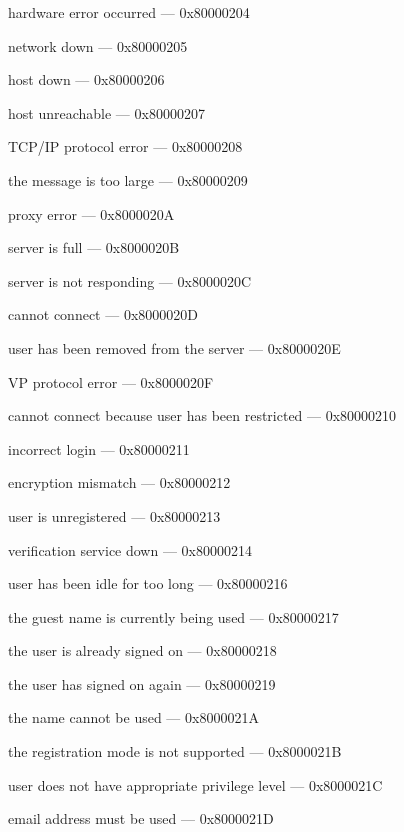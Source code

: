 \documentclass[titlepage,oneside]{book}
\begin{document}
hardware error occurred                           --- 0x80000204

network down                                      --- 0x80000205

host down                                         --- 0x80000206

host unreachable                                  --- 0x80000207

TCP/IP protocol error                             --- 0x80000208

the message is too large                          --- 0x80000209

proxy error                                       --- 0x8000020A

server is full                                    --- 0x8000020B

server is not responding                          --- 0x8000020C

cannot connect                                    --- 0x8000020D

user has been removed from the server             --- 0x8000020E

VP protocol error                                 --- 0x8000020F

cannot connect because user has been restricted   --- 0x80000210

incorrect login                                   --- 0x80000211

encryption mismatch                               --- 0x80000212

user is unregistered                              --- 0x80000213

verification service down                         --- 0x80000214

user has been idle for too long                   --- 0x80000216

the guest name is currently being used            --- 0x80000217

the user is already signed on                     --- 0x80000218

the user has signed on again                      --- 0x80000219

the name cannot be used                           --- 0x8000021A

the registration mode is not supported            --- 0x8000021B

user does not have appropriate privilege level    --- 0x8000021C

email address must be used                        --- 0x8000021D
\end{document}
